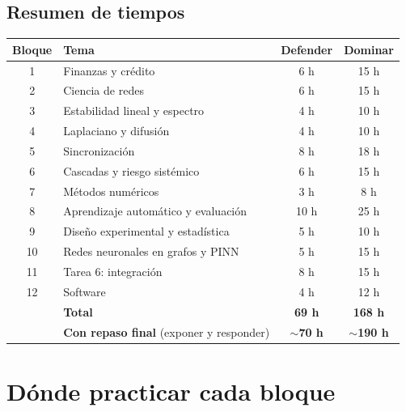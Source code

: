 \documentclass[11pt,a4paper,oneside]{article}
\begin{document}
\subsection*{Resumen de tiempos}
\begin{center}
\begin{tabular}{clcc}
\toprule
\textbf{Bloque} & \textbf{Tema} & \textbf{Defender} & \textbf{Dominar} \\
\midrule
1 & Finanzas y crédito & 6 h & 15 h \\
2 & Ciencia de redes & 6 h & 15 h \\
3 & Estabilidad lineal y espectro & 4 h & 10 h \\
4 & Laplaciano y difusión & 4 h & 10 h \\
5 & Sincronización & 8 h & 18 h \\
6 & Cascadas y riesgo sistémico & 6 h & 15 h \\
7 & Métodos numéricos & 3 h & 8 h \\
8 & Aprendizaje automático y evaluación & 10 h & 25 h \\
9 & Diseño experimental y estadística & 5 h & 10 h \\
10 & Redes neuronales en grafos y PINN & 5 h & 15 h \\
11 & Tarea 6: integración & 8 h & 15 h \\
12 & Software & 4 h & 12 h \\
\midrule
 & \textbf{Total} & \textbf{69 h} & \textbf{168 h} \\
 & \textbf{Con repaso final} (exponer y responder) & \textbf{$\sim$70 h} & \textbf{$\sim$190 h} \\
\bottomrule
\end{tabular}
\end{center}

\section{Dónde practicar cada bloque}
\end{document}
